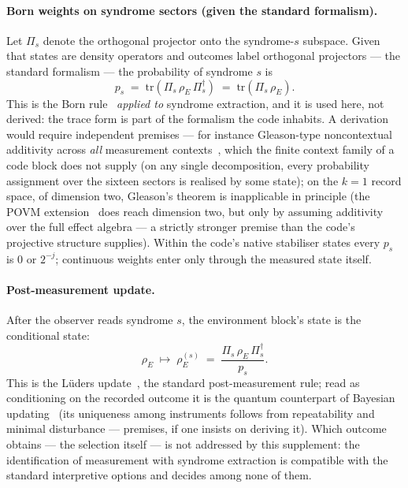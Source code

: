 \documentclass[11pt,a4paper]{article}
\newcommand{\proj}[1]{\Pi_{#1}}
\begin{document}
\paragraph{Born weights on syndrome sectors (given the standard formalism).}
Let $\proj{s}$ denote the orthogonal projector onto the syndrome-$s$ subspace. Given that states are density operators and outcomes label orthogonal projectors --- the standard formalism --- the probability of syndrome $s$ is
\begin{equation}
  p_s \;=\; \mathrm{tr}\!\left(\proj{s}\,\rho_E\,\proj{s}^\dagger\right)
  \;=\; \mathrm{tr}\!\left(\proj{s}\,\rho_E\right).
  \label{eq:born}
\end{equation}
This is the Born rule~\cite{Born1926} \emph{applied to} syndrome extraction, and it is used here, not derived: the trace form is part of the formalism the code inhabits. A derivation would require independent premises --- for instance Gleason-type noncontextual additivity across \emph{all} measurement contexts~\cite{Gleason1957}, which the finite context family of a code block does not supply (on any single decomposition, every probability assignment over the sixteen sectors is realised by some state); on the $k=1$ record space, of dimension two, Gleason's theorem is inapplicable in principle (the POVM extension~\cite{Busch2003} does reach dimension two, but only by assuming additivity over the full effect algebra --- a strictly stronger premise than the code's projective structure supplies). Within the code's native stabiliser states every $p_s$ is $0$ or $2^{-j}$; continuous weights enter only through the measured state itself.

\paragraph{Post-measurement update.}
After the observer reads syndrome $s$, the environment block's state is the conditional state:
\begin{equation}
  \rho_E \;\longmapsto\;
  \rho_E^{(s)}
  \;=\; \frac{\proj{s}\,\rho_E\,\proj{s}^\dagger}{p_s}.
  \label{eq:update}
\end{equation}
This is the L\"uders update~\cite{Lueders1951}, the standard post-measurement rule; read as conditioning on the recorded outcome it is the quantum counterpart of Bayesian updating~\cite{Bub1977} (its uniqueness among instruments follows from repeatability and minimal disturbance --- premises, if one insists on deriving it). Which outcome obtains --- the selection itself --- is not addressed by this supplement: the identification of measurement with syndrome extraction is compatible with the standard interpretive options and decides among none of them.
\end{document}

